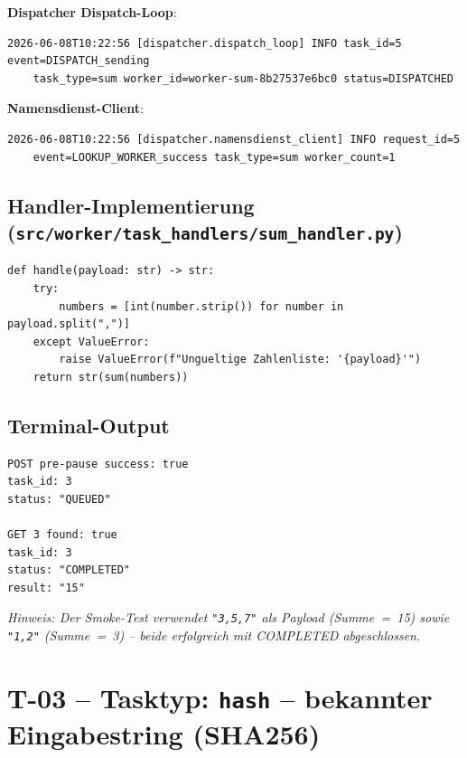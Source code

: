 \documentclass[a4paper,12pt]{article}
\begin{document}
\textbf{Dispatcher Dispatch-Loop}:
\begin{lstlisting}[style=log]
2026-06-08T10:22:56 [dispatcher.dispatch_loop] INFO task_id=5 event=DISPATCH_sending
    task_type=sum worker_id=worker-sum-8b27537e6bc0 status=DISPATCHED
\end{lstlisting}

\textbf{Namensdienst-Client}:
\begin{lstlisting}[style=log]
2026-06-08T10:22:56 [dispatcher.namensdienst_client] INFO request_id=5
    event=LOOKUP_WORKER_success task_type=sum worker_count=1
\end{lstlisting}

\subsection*{Handler-Implementierung (\texttt{src/worker/task\_handlers/sum\_handler.py})}

\begin{lstlisting}[style=python]
def handle(payload: str) -> str:
    try:
        numbers = [int(number.strip()) for number in payload.split(",")]
    except ValueError:
        raise ValueError(f"Ungueltige Zahlenliste: '{payload}'")
    return str(sum(numbers))
\end{lstlisting}

\subsection*{Terminal-Output}

\begin{lstlisting}[style=log]
POST pre-pause success: true
task_id: 3
status: "QUEUED"

GET 3 found: true
task_id: 3
status: "COMPLETED"
result: "15"
\end{lstlisting}

\textit{Hinweis: Der Smoke-Test verwendet \texttt{"3,5,7"} als Payload (Summe~=~15) sowie \texttt{"1,2"} (Summe~=~3) -- beide erfolgreich mit COMPLETED abgeschlossen.}

\newpage
\section*{T-03 -- Tasktyp: \texttt{hash} -- bekannter Eingabestring (SHA256)}
\end{document}

